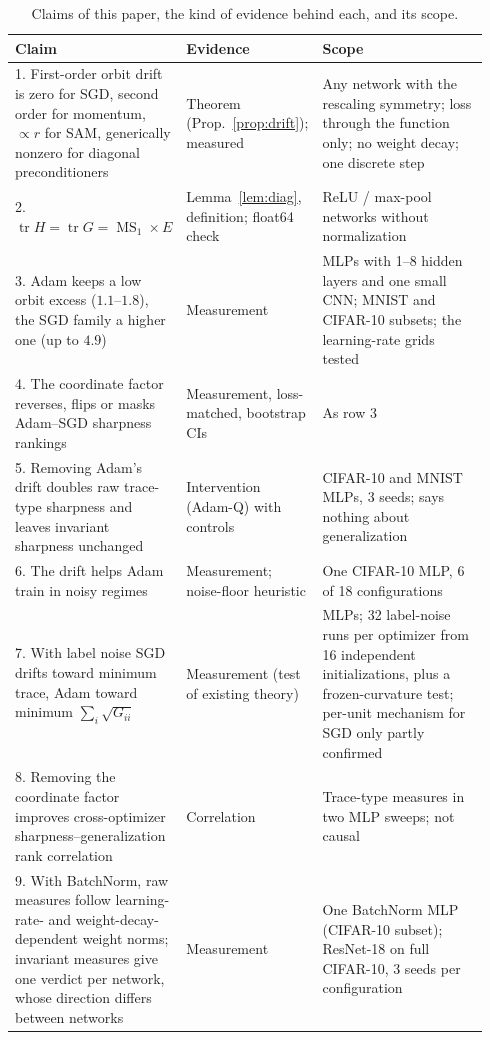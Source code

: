 \documentclass[10pt]{article}
\theoremstyle{remark}
\newcommand{\tr}{\operatorname{tr}}
\newcommand{\MS}{\operatorname{MS}}
\begin{document}
\begin{table}[t]
\centering
\small
\caption{Claims of this paper, the kind of evidence behind each, and its scope.}
\label{tab:claims}
\begin{tabular}{@{}p{0.36\linewidth}p{0.2\linewidth}p{0.38\linewidth}@{}}
\toprule
Claim & Evidence & Scope\\
\midrule
1. First-order orbit drift is zero for SGD, second order for momentum, $\propto r$ for SAM, generically nonzero for diagonal preconditioners & Theorem (Prop.~\ref{prop:drift}); measured & Any network with the rescaling symmetry; loss through the function only; no weight decay; one discrete step\\
2. $\tr H=\tr G=\MS_1\times E$ & Lemma~\ref{lem:diag}, definition; float64 check & ReLU / max-pool networks without normalization\\
3. Adam keeps a low orbit excess ($1.1$--$1.8$), the SGD family a higher one (up to $4.9$) & Measurement & MLPs with 1--8 hidden layers and one small CNN; MNIST and CIFAR-10 subsets; the learning-rate grids tested\\
4. The coordinate factor reverses, flips or masks Adam--SGD sharpness rankings & Measurement, loss-matched, bootstrap CIs & As row 3\\
5. Removing Adam's drift doubles raw trace-type sharpness and leaves invariant sharpness unchanged & Intervention (Adam-Q) with controls & CIFAR-10 and MNIST MLPs, 3 seeds; says nothing about generalization\\
6. The drift helps Adam train in noisy regimes & Measurement; noise-floor heuristic & One CIFAR-10 MLP, 6 of 18 configurations\\
7. With label noise SGD drifts toward minimum trace, Adam toward minimum $\sum_i\sqrt{G_{ii}}$ & Measurement (test of existing theory) & MLPs; 32 label-noise runs per optimizer from 16 independent initializations, plus a frozen-curvature test; per-unit mechanism for SGD only partly confirmed\\
8. Removing the coordinate factor improves cross-optimizer sharpness--generalization rank correlation & Correlation & Trace-type measures in two MLP sweeps; not causal\\
9. With BatchNorm, raw measures follow learning-rate- and weight-decay-dependent weight norms; invariant measures give one verdict per network, whose direction differs between networks & Measurement & One BatchNorm MLP (CIFAR-10 subset); ResNet-18 on full CIFAR-10, 3 seeds per configuration\\
\bottomrule
\end{tabular}
\end{table}
\end{document}
